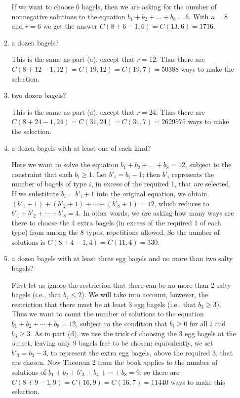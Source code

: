 \documentclass[11pt]{article}
\begin{document}
\begin{enumerate}[label=\textbf{\arabic*.}]
\begin{enumerate}[label=\textbf{\alph*)}]
		If we want to choose 6 bagels, then we are asking for the number of nonnegative solutions to the equation $b_1 + b_2 + \ldots + b_8 = 6$. With $n = 8$ and $r = 6$ we get the answer $C(8 + 6 - 1, 6) = C(13, 6) = 1716$.
		
		\item a dozen bagels?
		
		This is the same as part (a), except that $r = 12$. Thus there are $C(8 + 12 - 1, 12) = C(19, 12) = C(19, 7) = 50388$ ways to make the selection.
		
		\item two dozen bagels?
		
		This is the same as part (a), except that $r = 24$. Thus there are $C(8 + 24 - 1, 24) = C(31, 24) = C(31, 7) = 2629575$ ways to make the selection.
		
		\item a dozen bagels with at least one of each kind?
		
		Here we want to solve the equation $b_1 + b_2 + \ldots + b_8 = 12$, subject to the constraint that each $b_i \geq 1$. Let $b'_i = b_i - 1$; then $b'_i$ represents the number of bagels of type $i$, in excess of the required 1, that are selected. If we substitute $b_i = b'_i + 1$ into the original equation, we obtain $(b'_1 + 1) + (b'_2 + 1) + \cdots + (b'_8 + 1) = 12$, which reduces to $b'_1 + b'_2 + \cdots + b'_8 = 4$. In other words, we are asking how many ways are there to choose the 4 extra bagels (in excess of the required 1 of each type) from among the 8 types, repetitions allowed. So the number of solutions is $C(8 + 4 - 1, 4) = C(11, 4) = 330$.
		
		\item a dozen bagels with at least three egg bagels and no more than two salty bagels?
		
		First let us ignore the restriction that there can be no more than 2 salty bagels (i.e., that $b_4 \leq 2$). We will take into account, however, the restriction that there must be at least 3 egg bagels (i.e., that $b_3 \geq 3$). Thus we want to count the number of solutions to the equation $b_1 + b_2 + \cdots + b_8 = 12$, subject to the condition that $b_i \geq 0$ for all $i$ and $b_3 \geq 3$. As in part (d), we use the trick of choosing the 3 egg bagels at the outset, leaving only 9 bagels free to be chosen; equivalently, we set $b'_3 = b_3 - 3$, to represent the extra egg bagels, above the required 3, that are chosen. Now Theorem 2 from the book applies to the number of solutions of $b_1 + b_2 + b'_3 + b_4 + \cdots + b_8 = 9$, so there are $C(8 + 9 - 1, 9) = C(16, 9) = C(16, 7) = 11440$ ways to make this selection.
		

\end{enumerate}
\end{enumerate}
\end{document}

